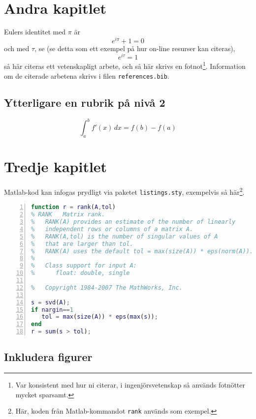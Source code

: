 \documentclass[10pt,oneside,swedish]{lips-no_customer}
\begin{document}
\section{Andra kapitlet}
Eulers identitet med $\pi$ är
\begin{equation}
  e^{i\pi} + 1 = 0
\end{equation}
och med $\tau$, se \citep{HartVi:2011} (se detta som ett exempel på
hur on-line resurser kan citeras), 
\begin{equation}
  e^{i\tau} = 1
\end{equation}
så här citeras ett vetenskapligt arbete\citep{einstein1905uber}, och
så här skrivs en fotnot\footnote{Var konsistent med hur ni citerar, i
  ingenjörsvetenskap så används fotnötter mycket
  sparsamt.}. Information om de citerade arbetena skrivs i filen \texttt{references.bib}.

\subsection{Ytterligare en rubrik på nivå 2}
\lipsum[10]

\begin{equation}
  \int_{a}^{b} f'(x)\,dx = f(b)-f(a)
\end{equation}

\section{Tredje kapitlet}
Matlab-kod kan infogas prydligt via paketet \texttt{listings.sty},
exempelvis så här\footnote{Här, koden från Matlab-kommandot
  \texttt{rank} används som exempel.}.
\begin{lstlisting}[language=Matlab,frame=single, numbers=left, stepnumber=2]
function r = rank(A,tol)
% RANK   Matrix rank.
%   RANK(A) provides an estimate of the number of linearly
%   independent rows or columns of a matrix A.
%   RANK(A,tol) is the number of singular values of A
%   that are larger than tol.
%   RANK(A) uses the default tol = max(size(A)) * eps(norm(A)).
%
%   Class support for input A:
%      float: double, single

%   Copyright 1984-2007 The MathWorks, Inc.

s = svd(A);
if nargin==1
   tol = max(size(A)) * eps(max(s));
end
r = sum(s > tol);
\end{lstlisting}

\subsection{Inkludera figurer}
\lipsum[7]
\end{document}
